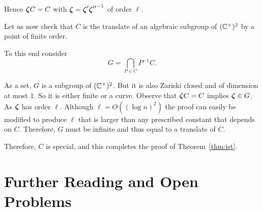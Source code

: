 Hence ${\boldsymbol{\zeta}} C=C$ with ${\boldsymbol{\zeta}} = {\boldsymbol{\zeta}}'{{\boldsymbol{\zeta}}''}^{-1}$ of order
$\ell$.

Let us now check that $C$ is the translate of an algebraic subgroup of
$({\mathbb{C}}^\times)^2$ by a point of finite order. %

To this end consider
\begin{equation*}
  G = \bigcap_{P\in C} P^{-1} C.
\end{equation*}

As a set, $G$ is a subgroup of $({\mathbb{C}}^\times)^2$. But it is also Zariski
closed and of dimension at most $1$. So it is either finite or a
curve. Observe that ${\boldsymbol{\zeta}} C = C$ implies ${\boldsymbol{\zeta}}\in G$. As
${\boldsymbol{\zeta}}$ has order $\ell$. Although $\ell = O((\log n)^2)$ the proof
can easily be modified to produce $\ell$ that is larger than any
prescribed constant that depends on $C$. Therefore, $G$ must be
infinite and thus equal to a translate of $C$.

Therefore, $C$ is special, and this completes the proof of
Theorem~\ref{thm:ist}.







\section{Further Reading and Open Problems}



